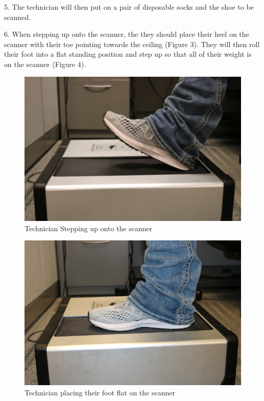 \newpage

5. The technician will then put on a pair of disposable socks and the shoe to be scanned.  

6.	When stepping up onto the scanner, the they should place their heel on the scanner with their toe pointing towards the ceiling (Figure 3).  They will then roll their foot into a flat standing position and step up so that all of their weight is on the scanner (Figure 4). 

\begin{figure}[!htp]
\centering
\includegraphics[scale=0.5]{2D_Step_on}
\caption{Technician Stepping up onto the scanner}
\label{Image 3}
\end{figure}


\begin{figure}[!htp]
\centering
\includegraphics[scale=0.3]{Stand_on_2D}
\caption{Technician placing their foot flat on the scanner}
\label{Image 4}
\end{figure}

